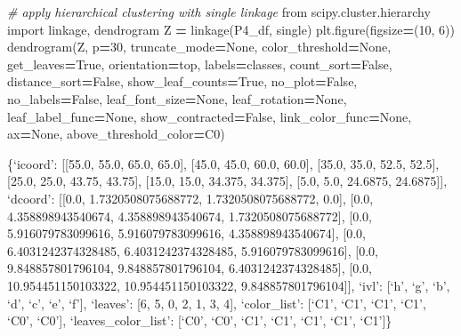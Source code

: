 \documentclass[
]{article}
\newenvironment{Shaded}{\begin{snugshade}}{\end{snugshade}}
\newcommand{\CommentTok}[1]{\textcolor[rgb]{0.56,0.35,0.01}{\textit{#1}}}
\newcommand{\DecValTok}[1]{\textcolor[rgb]{0.00,0.00,0.81}{#1}}
\newcommand{\ImportTok}[1]{#1}
\newcommand{\NormalTok}[1]{#1}
\newcommand{\OperatorTok}[1]{\textcolor[rgb]{0.81,0.36,0.00}{\textbf{#1}}}
\newcommand{\StringTok}[1]{\textcolor[rgb]{0.31,0.60,0.02}{#1}}
\newcommand{\VariableTok}[1]{\textcolor[rgb]{0.00,0.00,0.00}{#1}}
\begin{document}
\begin{Shaded}
\begin{Highlighting}[]
\CommentTok{\# apply hierarchical clustering with single linkage}
\ImportTok{from}\NormalTok{ scipy.cluster.hierarchy }\ImportTok{import}\NormalTok{ linkage, dendrogram}
\NormalTok{Z }\OperatorTok{=}\NormalTok{ linkage(P4\_df, }\StringTok{\textquotesingle{}single\textquotesingle{}}\NormalTok{)}
\NormalTok{plt.figure(figsize}\OperatorTok{=}\NormalTok{(}\DecValTok{10}\NormalTok{, }\DecValTok{6}\NormalTok{))}
\NormalTok{dendrogram(Z, p}\OperatorTok{=}\DecValTok{30}\NormalTok{, truncate\_mode}\OperatorTok{=}\VariableTok{None}\NormalTok{, color\_threshold}\OperatorTok{=}\VariableTok{None}\NormalTok{, get\_leaves}\OperatorTok{=}\VariableTok{True}\NormalTok{, orientation}\OperatorTok{=}\StringTok{\textquotesingle{}top\textquotesingle{}}\NormalTok{, labels}\OperatorTok{=}\NormalTok{classes, count\_sort}\OperatorTok{=}\VariableTok{False}\NormalTok{, distance\_sort}\OperatorTok{=}\VariableTok{False}\NormalTok{, show\_leaf\_counts}\OperatorTok{=}\VariableTok{True}\NormalTok{, no\_plot}\OperatorTok{=}\VariableTok{False}\NormalTok{, no\_labels}\OperatorTok{=}\VariableTok{False}\NormalTok{, leaf\_font\_size}\OperatorTok{=}\VariableTok{None}\NormalTok{, leaf\_rotation}\OperatorTok{=}\VariableTok{None}\NormalTok{, leaf\_label\_func}\OperatorTok{=}\VariableTok{None}\NormalTok{, show\_contracted}\OperatorTok{=}\VariableTok{False}\NormalTok{, link\_color\_func}\OperatorTok{=}\VariableTok{None}\NormalTok{, ax}\OperatorTok{=}\VariableTok{None}\NormalTok{, above\_threshold\_color}\OperatorTok{=}\StringTok{\textquotesingle{}C0\textquotesingle{}}\NormalTok{)}
\end{Highlighting}
\end{Shaded}

\{`icoord': {[}{[}55.0, 55.0, 65.0, 65.0{]}, {[}45.0, 45.0, 60.0,
60.0{]}, {[}35.0, 35.0, 52.5, 52.5{]}, {[}25.0, 25.0, 43.75, 43.75{]},
{[}15.0, 15.0, 34.375, 34.375{]}, {[}5.0, 5.0, 24.6875, 24.6875{]}{]},
`dcoord': {[}{[}0.0, 1.7320508075688772, 1.7320508075688772, 0.0{]},
{[}0.0, 4.358898943540674, 4.358898943540674, 1.7320508075688772{]},
{[}0.0, 5.916079783099616, 5.916079783099616, 4.358898943540674{]},
{[}0.0, 6.4031242374328485, 6.4031242374328485, 5.916079783099616{]},
{[}0.0, 9.848857801796104, 9.848857801796104, 6.4031242374328485{]},
{[}0.0, 10.954451150103322, 10.954451150103322, 9.848857801796104{]}{]},
`ivl': {[}`h', `g', `b', `d', `c', `e', `f'{]}, `leaves': {[}6, 5, 0, 2,
1, 3, 4{]}, `color\_list': {[}`C1', `C1', `C1', `C1', `C0', `C0'{]},
`leaves\_color\_list': {[}`C0', `C0', `C1', `C1', `C1', `C1', `C1'{]}\}
\end{document}
